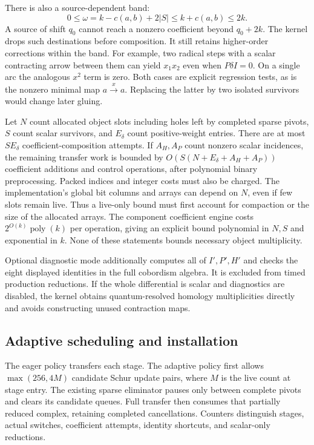 There is also a source-dependent band:
\[
 0\le\omega=k-c(a,b)+2|S|\le k+c(a,b)\le2k.
\]
A source of shift $q_0$ cannot reach a nonzero coefficient beyond $q_0+2k$.
The kernel drops such destinations before composition.  It still retains
higher-order corrections within the band.  For example, two radical steps
with a scalar contracting arrow between them can yield $x_1x_2$ even when
$P\delta I=0$.  On a single arc the analogous $x^2$ term is zero.  Both
cases are explicit regression tests, as is the nonzero minimal map
$a\xrightarrow{x}a$.  Replacing the latter by two isolated survivors would
change later gluing.

Let $N$ count allocated object slots including holes left by completed
sparse pivots, $S$ count scalar survivors, and $E_\delta$ count positive-weight
entries.  There are at most $S E_\delta$ coefficient-composition attempts.
If $A_H,A_P$ count nonzero scalar incidences, the remaining transfer work is
bounded by $O(S(N+E_\delta+A_H+A_P))$ coefficient additions and control
operations, after polynomial binary preprocessing.  Packed indices and
integer costs must also be charged.  The implementation's global bit columns
and arrays can depend on $N$, even if few slots remain live.  Thus a live-only
bound must first account for compaction or the size of the allocated arrays.
The component coefficient engine costs $2^{O(k)}\operatorname{poly}(k)$ per
operation, giving an explicit bound polynomial in $N,S$ and exponential in
$k$.  None of these statements bounds necessary object multiplicity.

Optional diagnostic mode additionally computes all of $I',P',H'$ and checks
the eight displayed identities in the full cobordism algebra.  It is excluded
from timed production reductions.  If the whole differential is scalar and
diagnostics are disabled, the kernel obtains quantum-resolved homology
multiplicities directly and avoids constructing unused contraction maps.

\subsection{Adaptive scheduling and installation}
The eager policy transfers each stage.  The adaptive policy first allows
$\max(256,4M)$ candidate Schur update pairs, where $M$ is the live count at
stage entry.  The existing sparse eliminator pauses only between complete
pivots and clears its candidate queues.  Full transfer then consumes that
partially reduced complex, retaining completed cancellations.  Counters
distinguish stages, actual switches, coefficient attempts, identity shortcuts,
and scalar-only reductions.

